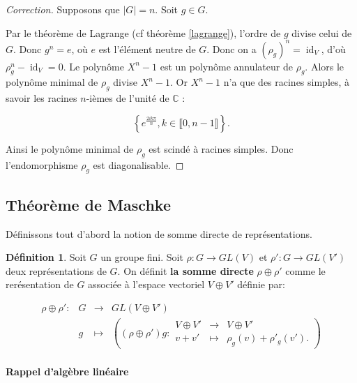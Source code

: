 \documentclass[french]{article}
\theoremstyle{theorem}
\theoremstyle{definition}
\newtheorem{protodefinition}{Définition}[section]
\newenvironment{definition}
    {\colorlet{shadecolor}{green!5}\begin{shaded}\begin{protodefinition}}
    {\end{protodefinition}\end{shaded}}
\theoremstyle{remark}
\newcommand{\C}{\mathbb{C}}
\begin{document}
\begin{proof}[Correction]
  Supposons que \(\lvert G \rvert = n\). Soit \(g \in G\).

  Par le théorème de Lagrange (cf théorème \ref{lagrange}), l'ordre de \(g\) divise celui de \(G\). Donc \(g^{n} = e\), où \(e\) est l'élément neutre de \(G\). Donc on a \((\rho_g)^{n} = \operatorname{id}_V\), d'où \(\rho_g^{n}-\operatorname{id}_V = 0\). Le polynôme \(X^{n}-1 \) est un polynôme annulateur de \(\rho_g\). Alors le polynôme minimal de \(\rho_g\) divise \(X^{n}-1\). Or \(X ^{n}-1\) n'a que des racines simples, à savoir les racines \(n\)-ièmes de l'unité de \(\C\) :

  \[\left\{ e^{\frac{2 i k \pi}{n}}, k \in \llbracket 0, n-1 \rrbracket \right\}.\]  %

  Ainsi le polynôme minimal de \(\rho_g\) est scindé à racines simples. Donc l'endomorphisme \(\rho_g\) est diagonalisable.
\end{proof}

\subsection{Théorème de Maschke}

Définissons tout d'abord la notion de somme directe de représentations.

\begin{definition}
  Soit \(G\) un groupe fini. Soit \(\rho : G \to GL(V)\) et \(\rho' : G \to GL(V')\) deux représentations de \(G\). On définit \textbf{la somme directe} \(\rho\oplus \rho'\) comme le rerésentation de \(G\) associée à l'espace vectoriel \(V \oplus V'\) définie par:

  \begin{equation}
    \begin{matrix}
    \rho \oplus \rho' : & G & \longrightarrow & GL(V\oplus V') \\
    \ & g & \longmapsto & \left((\rho \oplus \rho')g : \begin{matrix}
      V \oplus V' & \longrightarrow & V \oplus V' \\
      v + v' & \longmapsto & \rho_g(v) + \rho'_g(v').
    \end{matrix}\right)
    \end{matrix}
  \end{equation}
\end{definition}

\paragraph{Rappel d'algèbre linéaire}
\end{document}
